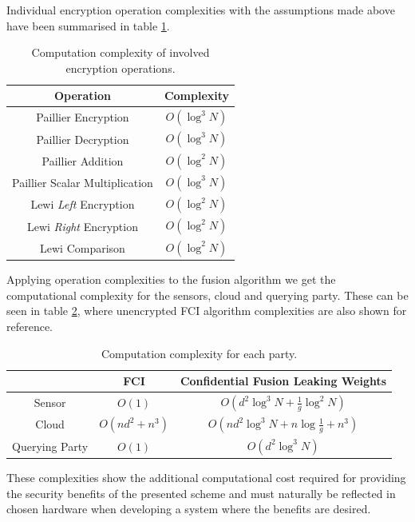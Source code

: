 Individual encryption operation complexities with the assumptions made above have been summarised in table \ref{tab:cloud_fusion:secfci_op_complexity}. 
\begin{table}[htbp]
    \centering
    \caption{Computation complexity of involved encryption operations.}
    \label{tab:cloud_fusion:secfci_op_complexity}
    \begin{tabular}{|c|c|}
        \hline
        \textbf{Operation} & \textbf{Complexity} \\ 
        \hline
        Paillier Encryption & $O(\log^3{N})$ \\ 
        Paillier Decryption & $O(\log^3{N})$ \\ 
        Paillier Addition & $O(\log^2{N})$ \\ 
        Paillier Scalar Multiplication & $O(\log^3{N})$ \\ 
        Lewi \textit{Left} Encryption & $O(\log^2{N})$ \\ 
        Lewi \textit{Right} Encryption & $O(\log^2{N})$ \\ 
        Lewi Comparison & $O(\log^2{N})$ \\ 
        \hline
    \end{tabular}
\end{table}
Applying operation complexities to the fusion algorithm we get the computational complexity for the sensors, cloud and querying party. These can be seen in table \ref{tab:cloud_fusion:secfci_complexity}, where unencrypted FCI algorithm complexities are also shown for reference. 
\begin{table}[htbp]
   \centering
   \caption{Computation complexity for each party.}
   \label{tab:cloud_fusion:secfci_complexity}
   \begin{tabular}{|c|c|c|}
      \hline
       & \textbf{FCI} & \textbf{Confidential Fusion Leaking Weights} \\ 
      \hline
      Sensor & $O(1)$ & $O\left(d^2\log^3{N} + \frac{1}{g}\log^2{N}\right)$ \\ 
      Cloud & $O\left(nd^2+n^3\right)$ & $O\left(nd^2\log^3{N} + n\log{\frac{1}{g}} + n^3\right)$ \\ 
      Querying Party & $O(1)$ & $O\left(d^2\log^3{N}\right)$ \\ 
      \hline
   \end{tabular}
\end{table}
These complexities show the additional computational cost required for providing the security benefits of the presented scheme and must naturally be reflected in chosen hardware when developing a system where the benefits are desired.

